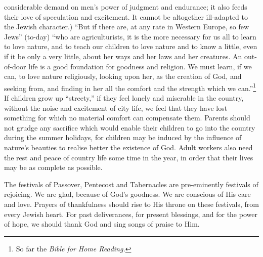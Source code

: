 considerable demand on men’s power of
judgment and endurance; it also feeds their
love of speculation and excitement. It
cannot be altogether ill-adapted to the
Jewish character.) “But if there are, at
any rate in Western Europe, so few Jews”
(to-day) “who are agriculturists, it is the
more necessary for us all to learn to love
nature, and to teach our children to love
nature and to know a little, even if it be only
a very little, about her ways and her laws
and her creatures. An out-of-door life is a
good foundation for goodness and religion.
We must learn, if we can, to love nature
religiously, looking upon her, as the creation
of God, and seeking from, and finding in her
all the comfort and the strength which we
can.”\footnote{So far the \textsl{Bible for Home Reading.}}
If children grow up “streety,” if
they feel lonely and miserable in the country,
without the noise and excitement of city life,
we feel that they have lost something for
which no material comfort can compensate
them. Parents should not grudge any
sacrifice which would enable their children
to go into the country during the summer
holidays, for children may be induced by
the influence of nature’s beauties to realise
better the existence of God. Adult workers
also need the rest and peace of country
life some time in the year, in order that
their lives may be as complete as possible.

The festivals of Passover, Pentecost and
Tabernacles are pre-emi\-nent\-ly festivals of
rejoicing. We are glad, because of God’s
goodness. We are conscious of His care and
love. Prayers of thankfulness should rise
to His throne on these festivals, from every
Jewish heart. For past deliverances, for
present blessings, and for the power of hope,
we should thank God and sing songs of
praise to Him.

